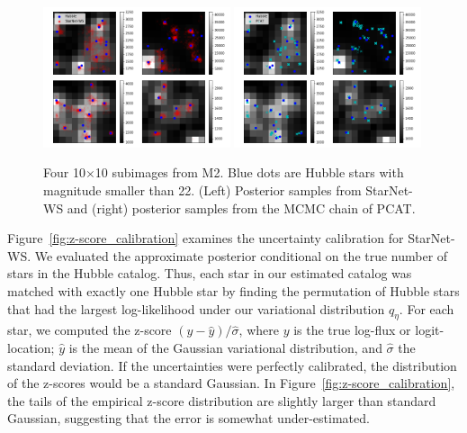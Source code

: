 \begin{figure}[H]
    \centering
    \includegraphics[width=0.49\textwidth]{figures/example_subimages_samples_ws.png}
    \includegraphics[width=0.49\textwidth]{figures/example_subimages_samples_pcat.png}
    \caption{Four 10$\times$10 subimages from
    M2. Blue dots are Hubble stars with magnitude smaller than 22. (Left) Posterior samples from StarNet-WS and (right) posterior samples from the MCMC chain of PCAT. }
    \label{fig:example_subimages_sampled}
\end{figure}

Figure~\ref{fig:z-score_calibration} examines the uncertainty calibration for StarNet-WS. 
We evaluated the approximate posterior 
conditional on the true number of stars in the Hubble catalog. 
Thus, each star in our estimated catalog was matched with exactly one Hubble star by finding the permutation of Hubble stars that had the largest log-likelihood under our variational distribution $q_\eta$. 
For each star, we computed the z-score $(y - \hat y) / \hat \sigma$, where $y$ is the true log-flux or 
logit-location; $\hat y$ is the mean of the Gaussian variational distribution, and $\hat\sigma$ the standard deviation.
If the uncertainties were perfectly calibrated, the distribution of the z-scores would be a standard Gaussian. 
In Figure~\ref{fig:z-score_calibration}, the tails of the empirical z-score distribution are slightly larger than standard Gaussian, suggesting that the error is somewhat under-estimated. 


